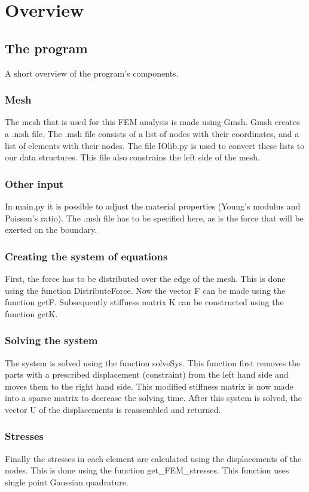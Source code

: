 \chapter{Overview}

\section{The program}
A short overview of the program's components.

\subsection{Mesh}
The mesh that is used for this FEM analysis is made using Gmsh. Gmsh creates a .msh file. The .msh file consists of a list of nodes with their coordinates, and a list of elements with their nodes. The file IOlib.py is used to convert these lists to our data structures. This file also constrains the left side of the mesh. 
\subsection{Other input}
In main.py it is possible to adjust the material properties (Young's modulus and Poisson's ratio). The .msh file has to be specified here, as is the force that will be exerted on the boundary. 
\subsection{Creating the system of equations}
First, the force has to be distributed over the edge of the mesh. This is done using the function Distribute\textunderscore Force. Now the vector F can be made using the function getF. Subsequently stiffness matrix K can be constructed using the function getK. 
\subsection{Solving the system}
The system is solved using the function solveSys. This function first removes the parts with a prescribed displacement (constraint) from the left hand side and moves them to the right hand side. This modified stiffness matrix is now made into a sparse matrix to decrease the solving time. After this system is solved, the vector U of the displacements is reassembled and returned. 
\subsection{Stresses}
Finally the stresses in each element are calculated using the displacements of the nodes. This is done using the function get\_FEM\_stresses. This function uses single point Gaussian quadrature.


